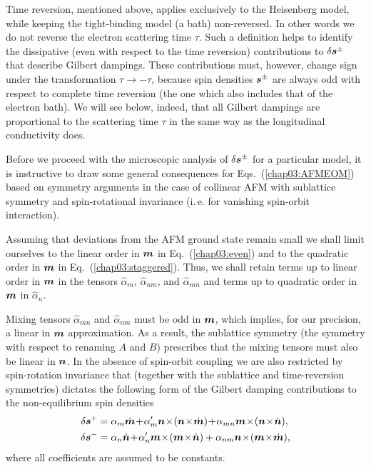 Time reversion, mentioned above, applies exclusively to the Heisenberg model, while keeping the tight-binding model (a bath) non-reversed. In other words we do not reverse the electron scattering time $\tau$. Such a definition helps to identify the dissipative (even with respect to the time reversion) contributions to $\delta\boldsymbol{s}^{\pm}$ that describe Gilbert dampings. These contributions must, however, change sign under the transformation $\tau \to -\tau$, because spin densities $\boldsymbol{s}^\pm$ are always odd with respect to complete time reversion (the one which also includes that of the electron bath). We will see below, indeed, that all Gilbert dampings are proportional to the scattering time $\tau$ in the same way as the longitudinal conductivity does.  

Before we proceed with the microscopic analysis of $\delta\boldsymbol{s}^{\pm}$ for a particular model, it is instructive to draw some general consequences for Eqs.~(\ref{chap03:AFMEOM}) based on symmetry arguments in the case of collinear AFM with sublattice symmetry and spin-rotational invariance (i.\,e. for vanishing spin-orbit interaction).  

Assuming that deviations from the AFM ground state remain small we shall limit ourselves to the linear order in $\boldsymbol{m}$ in Eq.~(\ref{chap03:even}) and to the quadratic order in $\boldsymbol{m}$ in Eq.~(\ref{chap03:staggered}).  Thus, we shall retain terms up to linear order in $\boldsymbol{m}$ in the tensors $\hat{\alpha}_{m}$, $\hat{\alpha}_{nm}$, and $\hat{\alpha}_{mn}$ and terms up to quadratic order in $\boldsymbol{m}$ in $\hat{\alpha}_n$. 

Mixing tensors $\hat{\alpha}_{mn}$ and $\hat{\alpha}_{nm}$ must be odd in $\boldsymbol{m}$, which implies, for our precision, a linear in $\boldsymbol{m}$ approximation. As a result, the sublattice symmetry (the symmetry with respect to renaming $A$ and $B$) prescribes that the mixing tensors must also be linear in $\boldsymbol{n}$. In the absence of spin-orbit coupling we are also restricted by spin-rotation invariance that (together with the sublattice and time-reversion symmetries) dictates the following form of the Gilbert damping contributions to the non-equilibrium spin densities
\beml
\label{chap03:gen}
\begin{align}
\label{chap03:even}
\delta \bb{s}^{+} & = \alpha_m \dot{\bb{m}}  \!+\! \alpha'_m \bb{n}  \!\times\! (\bb{n} \!\times\! \dot{\bb{m}}) \!+\!\alpha_{mn}\bb{m}  \!\times\!  (\bb{n}  \!\times\!  \dot{\bb{n}}),\\
\delta \bb{s}^{-} &= \alpha_n \dot{\bb{n}} \!+\! \alpha'_n \bb{m}  \!\times\! (\bb{m} \!\times\! \dot{\bb{n}}) + \alpha_{nm} \bb{n}\!\times\!(\bb{m}\!\times\! \dot{\bb{m}}),
\label{chap03:staggered}
\end{align}
\eml
where all coefficients are assumed to be constants.  

